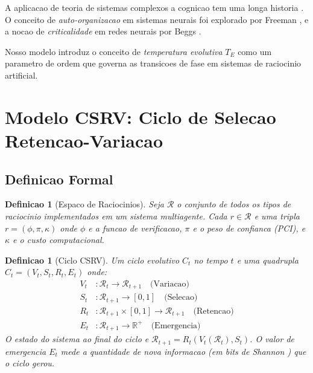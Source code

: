 \documentclass[5p]{elsarticle}
\newtheorem{definition}[theorem]{Definicao}
\begin{document}
A aplicacao de teoria de sistemas complexos a cognicao tem uma longa historia
\cite{kelso1995,haken1983}. O conceito de \textit{auto-organizacao} em sistemas
neurais foi explorado por Freeman \cite{freeman2000}, e a nocao de
\textit{criticalidade} em redes neurais por Beggs \cite{beggs2003}.

Nosso modelo introduz o conceito de \textit{temperatura evolutiva} $T_E$ como
um parametro de ordem que governa as transicoes de fase em sistemas de
raciocinio artificial.

\section{Modelo CSRV: Ciclo de Selecao Retencao-Variacao}

\subsection{Definicao Formal}

\begin{definition}[Espaco de Raciocinios]
  Seja $\mathcal{R}$ o conjunto de todos os tipos de raciocinio implementados
  em um sistema multiagente. Cada $r \in \mathcal{R}$ e uma tripla
  $r = (\phi, \pi, \kappa)$ onde $\phi$ e a funcao de verificacao,
  $\pi$ e o peso de confianca (PCI), e $\kappa$ e o custo computacional.
\end{definition}

\begin{definition}[Ciclo CSRV]
  Um ciclo evolutivo $C_t$ no tempo $t$ e uma quadrupla
  $C_t = (V_t, S_t, R_t, E_t)$ onde:
  \begin{align*}
    V_t &: \mathcal{R}_t \to \mathcal{R}_{t+1} \quad \text{(Variacao)} \\
    S_t &: \mathcal{R}_{t+1} \to [0,1] \quad \text{(Selecao)} \\
    R_t &: \mathcal{R}_{t+1} \times [0,1] \to \mathcal{R}_{t+1} \quad \text{(Retencao)} \\
    E_t &: \mathcal{R}_{t+1} \to \mathbb{R}^+ \quad \text{(Emergencia)}
  \end{align*}
  O estado do sistema ao final do ciclo e $\mathcal{R}_{t+1} = R_t(V_t(\mathcal{R}_t), S_t)$.
  O valor de emergencia $E_t$ mede a quantidade de nova informacao
  (em bits de Shannon \cite{shannon1948}) que o ciclo gerou.
\end{definition}
\end{document}
